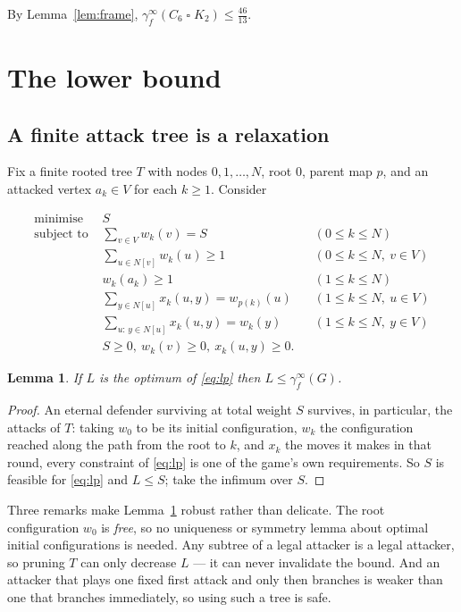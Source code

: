 \documentclass[11pt]{amsart}
\newtheorem{lemma}[theorem]{Lemma}
\theoremstyle{remark}
\newcommand{\fed}{\gamma_f^{\infty}}
\begin{document}
By Lemma~\ref{lem:frame}, $\fed(C_6\mathbin{\square}K_2)\le\tfrac{46}{13}$.

\section{The lower bound}\label{sec:lower}

\subsection{A finite attack tree is a relaxation}
Fix a finite rooted tree $T$ with nodes $0,1,\dots,N$, root $0$, parent map
$p$, and an attacked vertex $a_k\in V$ for each $k\ge1$. Consider

\begin{equation}\label{eq:lp}
\begin{aligned}
\text{minimise } & S\\
\text{subject to } &\textstyle\sum_{v\in V}w_k(v)=S && (0\le k\le N)\\
 &\textstyle\sum_{u\in N[v]}w_k(u)\ge1 && (0\le k\le N,\ v\in V)\\
 & w_k(a_k)\ge1 && (1\le k\le N)\\
 &\textstyle\sum_{y\in N[u]}x_k(u,y)=w_{p(k)}(u) && (1\le k\le N,\ u\in V)\\
 &\textstyle\sum_{u:\,y\in N[u]}x_k(u,y)=w_k(y) && (1\le k\le N,\ y\in V)\\
 & S\ge0,\ w_k(v)\ge0,\ x_k(u,y)\ge0. &&
\end{aligned}
\end{equation}

\begin{lemma}\label{lem:relax}
If $L$ is the optimum of \eqref{eq:lp} then $L\le\fed(G)$.
\end{lemma}

\begin{proof}
An eternal defender surviving at total weight $S$ survives, in particular, the
attacks of $T$: taking $w_0$ to be its initial configuration, $w_k$ the
configuration reached along the path from the root to $k$, and $x_k$ the moves
it makes in that round, every constraint of \eqref{eq:lp} is one of the game's
own requirements. So $S$ is feasible for \eqref{eq:lp} and $L\le S$; take the
infimum over $S$.
\end{proof}

Three remarks make Lemma~\ref{lem:relax} robust rather than delicate. The root
configuration $w_0$ is \emph{free}, so no uniqueness or symmetry lemma about
optimal initial configurations is needed. Any subtree of a legal attacker is a
legal attacker, so pruning $T$ can only decrease $L$ --- it can never
invalidate the bound. And an attacker that plays one fixed first attack and
only then branches is weaker than one that branches immediately, so using such
a tree is safe.
\end{document}
